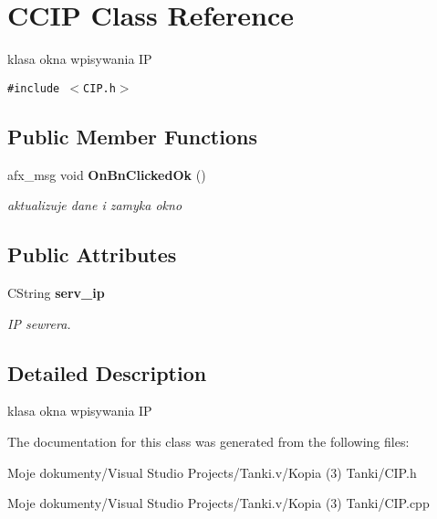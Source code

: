 \section{CCIP Class Reference}
\label{class_c_c_i_p}
klasa okna wpisywania IP  


{\tt \#include $<$CIP.h$>$}

\subsection*{Public Member Functions}
\begin{CompactItemize}
\item 
afx\_\-msg void {\bf OnBnClickedOk} ()\label{class_c_c_i_p_420b883aa5e5054b2e0518524cb0d314}

\begin{CompactList}\small\item\em aktualizuje dane i zamyka okno \item\end{CompactList}\end{CompactItemize}
\subsection*{Public Attributes}
\begin{CompactItemize}
\item 
CString {\bf serv\_\-ip}\label{class_c_c_i_p_9845b33a66ad3711a26f384579b49742}

\begin{CompactList}\small\item\em IP sewrera. \item\end{CompactList}\end{CompactItemize}


\subsection{Detailed Description}
klasa okna wpisywania IP 



The documentation for this class was generated from the following files:\begin{CompactItemize}
\item 
Moje dokumenty/Visual Studio Projects/Tanki.v/Kopia (3) Tanki/CIP.h\item 
Moje dokumenty/Visual Studio Projects/Tanki.v/Kopia (3) Tanki/CIP.cpp\end{CompactItemize}
